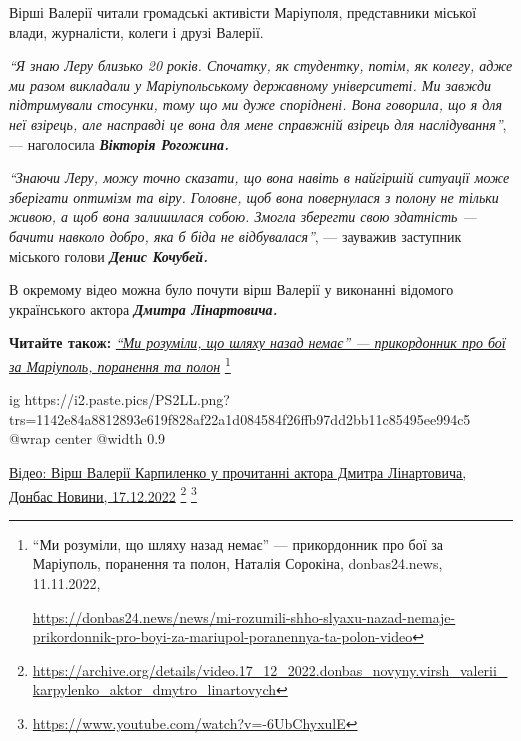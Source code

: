 Вірші Валерії читали громадські активісти Маріуполя, представники міської
влади, журналісти, колеги і друзі Валерії.

\begin{leftbar}
\emph{\enquote{Я знаю Леру близько 20 років. Спочатку, як студентку, потім, як колегу,
адже ми разом викладали у Маріупольському державному університеті. Ми завжди
підтримували стосунки, тому що ми дуже споріднені. Вона говорила, що я для неї
взірець, але насправді це вона для мене справжній взірець для наслідування}}, —
наголосила \emph{\textbf{Вікторія Рогожина.}}
\end{leftbar}

\begin{leftbar}
\emph{\enquote{Знаючи Леру, можу точно сказати, що вона навіть в найгіршій ситуації може
зберігати оптимізм та віру. Головне, щоб вона повернулася з полону не тільки
живою, а щоб вона залишилася собою. Змогла зберегти свою здатність — бачити
навколо добро, яка б біда не відбувалася}}, — зауважив заступник міського голови
\emph{\textbf{Денис Кочубей.}}
\end{leftbar}

В окремому відео можна було почути вірш Валерії у виконанні відомого
українського актора \emph{\textbf{Дмитра Лінартовича.}}

\textbf{Читайте також:} \href{https://donbas24.news/news/mi-rozumili-shho-slyaxu-nazad-nemaje-prikordonnik-pro-boyi-za-mariupol-poranennya-ta-polon-video}{\emph{\enquote{Ми розуміли, що шляху назад немає} — прикордонник про бої за Маріуполь, поранення та полон}}%
\footnote{\enquote{Ми розуміли, що шляху назад немає} — прикордонник про бої за Маріуполь, поранення та полон, Наталія Сорокіна, donbas24.news, 11.11.2022, \par%
\url{https://donbas24.news/news/mi-rozumili-shho-slyaxu-nazad-nemaje-prikordonnik-pro-boyi-za-mariupol-poranennya-ta-polon-video}%
}

\ifcmt
  ig https://i2.paste.pics/PS2LL.png?trs=1142e84a8812893e619f828af22a1d084584f26ffb97dd2bb11c85495ee994c5
  @wrap center
  @width 0.9
\fi

\href{https://archive.org/details/video.17_12_2022.donbas_novyny.virsh_valerii_karpylenko_aktor_dmytro_linartovych}{%
Відео: Вірш Валерії Карпиленко у прочитанні актора Дмитра Лінартовича, Донбас Новини, 17.12.2022}%
\footnote{\url{https://archive.org/details/video.17_12_2022.donbas_novyny.virsh_valerii_karpylenko_aktor_dmytro_linartovych}} %
\footnote{\url{https://www.youtube.com/watch?v=-6UbChyxulE}}


